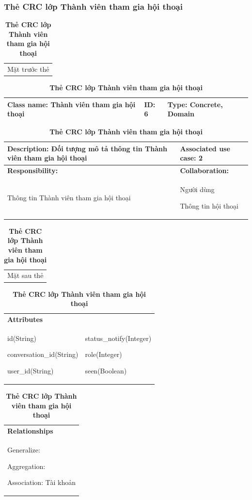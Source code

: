   \subsubsection{Thẻ CRC lớp Thành viên tham gia hội thoại}
  \begin{table}[H]
    \caption{\bfseries \fontsize{12pt}{0pt}\selectfont Thẻ CRC lớp Thành viên tham gia hội thoại}
    \centering
    \begin{tabularx}{0.9\textwidth}{X}
      Mặt trước thẻ
    \end{tabularx}
    \begin{tabularx}{0.9\textwidth}{|X|X|X|}
      \hline
      \textbf{Class name:} Thành viên tham gia hội thoại & \textbf{ID:} 6 & \textbf{Type:} Concrete, Domain \\
      \hline
    \end{tabularx}
    \begin{tabularx}{0.9\textwidth}{|X|X|}
      \textbf{Description:} Đối tượng mô tả thông tin Thành viên tham gia hội thoại & \textbf{Associated use case:} 2 \\
      \hline
      \textbf{Responsibility:} & \textbf{Collaboration:} \\
      Thông tin Thành viên tham gia hội thoại
      & 
      Người dùng

      Thông tin hội thoại 
      \\
      \hline
    \end{tabularx}
    \begin{tabularx}{0.9\textwidth}{X}
      Mặt sau thẻ
    \end{tabularx}
    \begin{tabularx}{0.9\textwidth}{|X|X|}
      \hline
      \textbf{Attributes} & \\
      id(String) 
      
      conversation\_id(String)

      user\_id(String)
      &
      status\_notify(Integer)

      role(Integer)

      seen(Boolean)
      \\
      \hline
    \end{tabularx}
    \begin{tabularx}{0.9\textwidth}{|X|}
      \textbf{Relationships} \\
      Generalize:  

      Aggregation:  
      
      Association: Tài khoản 
      \\
      \hline
    \end{tabularx}
  \end{table}

